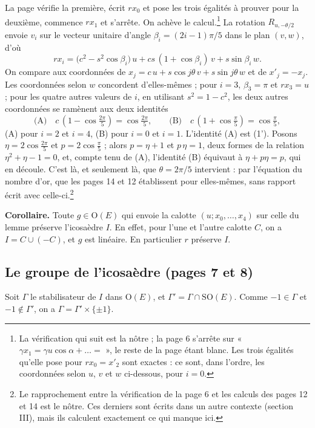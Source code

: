 \documentclass[11pt,a4paper]{article}
\begin{document}
La page vérifie la première, écrit $r x_0$ et pose les trois égalités à
prouver pour la deuxième, commence $r x_1$ et s'arrête. On achève le
calcul.\footnote{La vérification qui suit est la nôtre ; la page 6 s'arrête
sur « $\gamma x_1 = \gamma u \cos\alpha + \ldots = $ », le reste de la page
étant blanc. Les trois égalités qu'elle pose pour $r x_0 = x'_2$ sont
exactes : ce sont, dans l'ordre, les coordonnées selon $u$, $v$ et $w$
ci-dessous, pour $i = 0$.} La rotation $R_{u,-\theta/2}$ envoie $v_i$ sur le
vecteur unitaire d'angle $\beta_i = (2i - 1)\pi/5$ dans le plan $(v, w)$, d'où
\[
r x_i = \bigl(c^{2} - s^{2}\cos\beta_i\bigr)\,u + cs\,(1 + \cos\beta_i)\,v + s\sin\beta_i\,w .
\]
On compare aux coordonnées de $x_j = c\,u + s\cos j\theta\,v + s\sin j\theta\,w$
et de $x'_j = -x_j$. Les coordonnées selon $w$ concordent d'elles-mêmes ; pour
$i = 3$, $\beta_3 = \pi$ et $r x_3 = u$ ; pour les quatre autres valeurs de
$i$, en utilisant $s^{2} = 1 - c^{2}$, les deux autres coordonnées se ramènent
aux deux identités
\[
\text{(A)}\quad c\,(1 - \cos\tfrac{2\pi}{5}) = \cos\tfrac{2\pi}{5},
\qquad
\text{(B)}\quad c\,(1 + \cos\tfrac{\pi}{5}) = \cos\tfrac{\pi}{5},
\]
(A) pour $i = 2$ et $i = 4$, (B) pour $i = 0$ et $i = 1$. L'identité (A) est
(1'). Posons $\eta = 2\cos\frac{2\pi}{5}$ et $p = 2\cos\frac{\pi}{5}$ ; alors
$p = \eta + 1$ et $p\,\eta = 1$, deux formes de la relation
$\eta^{2} + \eta - 1 = 0$, et, compte tenu de (A), l'identité (B) équivaut à
$\eta + p\eta = p$, qui en découle. C'est là, et seulement là, que
$\theta = 2\pi/5$ intervient : par l'équation du nombre d'or, que les pages 14
et 12 établissent pour elles-mêmes, sans rapport écrit avec
celle-ci.\footnote{Le rapprochement entre la vérification de la page 6 et
les calculs des pages 12 et 14 est le nôtre. Ces derniers sont écrits dans
un autre contexte (section III), mais ils calculent exactement ce qui manque
ici.}

\textbf{Corollaire.} Toute $g \in \mathrm{O}(E)$ qui envoie la calotte
$(u; x_0, \ldots, x_4)$ sur celle du lemme préserve l'icosaèdre $I$. En
effet, pour l'une et l'autre calotte $C$, on a $I = C \cup (-C)$, et $g$ est
linéaire. En particulier $r$ préserve $I$.

\subsection*{Le groupe de l'icosaèdre (pages 7 et 8)}

Soit $\Gamma$ le stabilisateur de $I$ dans $\mathrm{O}(E)$, et
$\Gamma' = \Gamma \cap \mathrm{SO}(E)$. Comme $-1 \in \Gamma$ et
$-1 \notin \Gamma'$, on a $\Gamma = \Gamma' \times \{\pm 1\}$.
\end{document}
